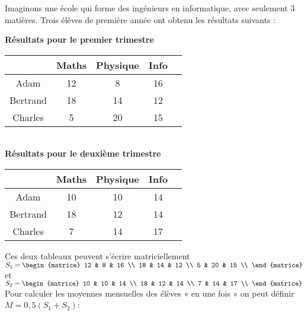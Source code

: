 Imaginons une école qui forme des ingénieurs en informatique, avec seulement 3 matières.
Trois élèves de première année ont obtenu les résultats suivants :

\begin{center}
	\textbf{Résultats pour le premier trimestre}\\[1em]
	\tabstyle[UGLiBlue]
	\begin{tabular}{|c|c|c|c|c|}
		\hline
		\bcell   & \ccell Maths & \ccell Physique & \ccell Info \\
		\hline
		Adam     & 12           & 8               & 16          \\
		\hline
		Bertrand & 18           & 14              & 12          \\
		\hline
		Charles  & 5            & 20              & 15          \\
		\hline
	\end{tabular}\\
	
	\textbf{Résultats pour le deuxième trimestre}\\[1em]
	
	\begin{tabular}{|c|c|c|c|c|}
		\hline
		\bcell   & \ccell Maths & \ccell Physique & \ccell Info \\
		\hline
		Adam     & 10           & 10              & 14          \\
		\hline
		Bertrand & 18           & 12              & 14          \\
		\hline
		Charles  & 7            & 14              & 17          \\
		\hline
	\end{tabular}
\end{center}

Ces deux tableaux peuvent s'écrire matriciellement
$S_1= \begin{matrice}
		12 & 8 & 16 \\
		18 & 14 & 12 \\
		5 & 20 & 15 \\
	\end{matrice}$
et $S_2= \begin{matrice}
		10 & 10 & 14 \\
		18 & 12 & 14 \\
		7 & 14 & 17 \\
	\end{matrice}$\\

Pour calculer les moyennes mensuelles des élèves « en une fois » on peut définir $M=0,5(S_1+S_2)$:

